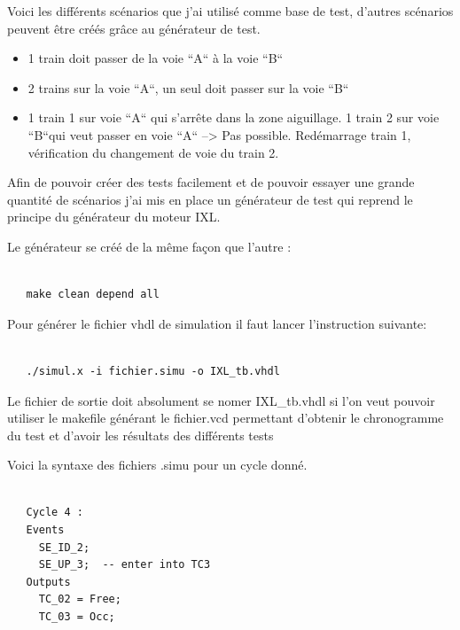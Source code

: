 Voici les différents scénarios que j'ai utilisé comme base de test,
d'autres scénarios peuvent être créés  grâce au générateur de test.

\medskip

\begin{itemize}
    \item 1 train doit passer de la voie ``A`` à la voie ``B``
    \item 2 trains sur la voie ``A``, un seul doit passer sur la voie ``B``
    \item 1 train 1 sur voie ``A`` qui s'arrête dans la zone aiguillage.
          1 train 2 sur voie ``B``qui veut passer en voie ``A`` --> Pas
          possible. Red\'emarrage train 1, v\'erification du
          changement  de voie du train 2.
\end{itemize}

\medskip

Afin de pouvoir créer des tests facilement et de pouvoir essayer une
grande quantité de scénarios j'ai mis en place un générateur de test
qui reprend le principe du générateur du moteur IXL.

\smallskip

Le générateur se créé de la même façon que l'autre :

\begin{lstlisting}

   make clean depend all

\end{lstlisting}
  
\medskip

Pour générer le fichier vhdl de simulation il faut lancer l'instruction suivante:

\begin{lstlisting}

   ./simul.x -i fichier.simu -o IXL_tb.vhdl 

\end{lstlisting}

\medskip

Le fichier de sortie doit absolument se nomer IXL\_tb.vhdl si l'on
veut pouvoir utiliser le makefile générant le fichier.vcd permettant
d'obtenir le chronogramme du test et d'avoir les résultats des
différents tests

\medskip

Voici la syntaxe des fichiers .simu pour un cycle donné.

\begin{lstlisting}

   Cycle 4 :
   Events
     SE_ID_2;  
     SE_UP_3;  -- enter into TC3	
   Outputs
     TC_02 = Free;
     TC_03 = Occ;  

\end{lstlisting}


